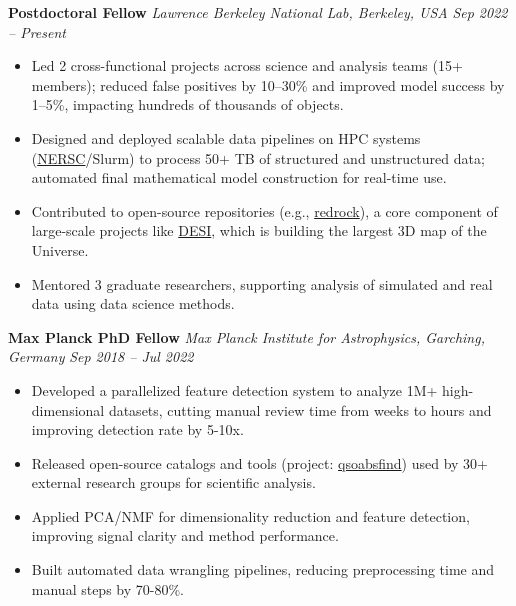 \documentclass[a4paper,10pt]{article}
\begin{document}
\textbf{Postdoctoral Fellow } \hfill \textit{Lawrence Berkeley National Lab, Berkeley, USA} \hfill \textit{Sep 2022 – Present} 
\begin{itemize}

    \item Led 2 cross-functional projects across science and analysis teams (15+ members); reduced false positives by 10–30\% and improved model success by 1–5\%, impacting hundreds of thousands of objects.

    \item Designed and deployed scalable data pipelines on HPC systems (\href{https://www.nersc.gov/}{NERSC}/Slurm) to process 50+ TB of structured and unstructured data; automated final mathematical model construction for real-time use.

     \item Contributed to open-source repositories (e.g., \href{https://github.com/desihub/redrock}{redrock}), a core component of large-scale projects like \href{https://en.wikipedia.org/wiki/Dark_Energy_Spectroscopic_Instrument}{DESI}, which is building the largest 3D map of the Universe.

    \item Mentored 3 graduate researchers, supporting analysis of simulated and real data using data science methods.
    
    \end{itemize}
    
\vspace{2mm}
\textbf{Max Planck PhD Fellow} \hfill \textit{Max Planck Institute for Astrophysics, Garching, Germany} \hfill \textit{Sep 2018 – Jul 2022} 
\begin{itemize}

    \item Developed a parallelized feature detection system to analyze 1M+ high-dimensional datasets, cutting manual review time from weeks to hours and improving detection rate by 5-10x.

    \item Released open-source catalogs and tools (project: \href{https://github.com/abhi0395/qsoabsfind}{qsoabsfind}) used by 30+ external research groups for scientific analysis.

    \item Applied PCA/NMF for dimensionality reduction and feature detection, improving signal clarity and method performance.

    \item Built automated data wrangling pipelines, reducing preprocessing time and manual steps by 70-80\%.
    
\end{itemize}
\end{document}
